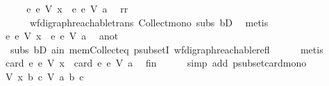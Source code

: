 \begin{isabellebody}
\ \ \isamarkupfalse%
\ \isamarkupfalse%
\ {\isachardoublequoteopen}{\isacharbraceleft}{\kern0pt}e{\isachardot}{\kern0pt}\ e\ {\isasymrightarrow}\isactrlsup {\isacharasterisk}{\kern0pt}\isactrlbsub V\isactrlesub \ x{\isacharbraceright}{\kern0pt}\ {\isasymsubseteq}\ {\isacharbraceleft}{\kern0pt}e{\isachardot}{\kern0pt}\ e\ {\isasymrightarrow}\isactrlsup {\isacharasterisk}{\kern0pt}\isactrlbsub V\isactrlesub \ a{\isacharbraceright}{\kern0pt}{\isachardoublequoteclose}\ \isamarkupfalse%
\ rr\isanewline
\ \ \ \ \ \ wf{\isacharunderscore}{\kern0pt}digraph{\isachardot}{\kern0pt}reachable{\isacharunderscore}{\kern0pt}trans\ Collect{\isacharunderscore}{\kern0pt}mono\ subs\ bD{}\ \isamarkupfalse%
\ metis\isanewline
\ \ \isamarkupfalse%
\ \isamarkupfalse%
\ {\isachardoublequoteopen}{\isacharbraceleft}{\kern0pt}e{\isachardot}{\kern0pt}\ e\ {\isasymrightarrow}\isactrlsup {\isacharasterisk}{\kern0pt}\isactrlbsub V\isactrlesub \ x{\isacharbraceright}{\kern0pt}\ {\isasymsubset}\ {\isacharbraceleft}{\kern0pt}e{\isachardot}{\kern0pt}\ e\ {\isasymrightarrow}\isactrlsup {\isacharasterisk}{\kern0pt}\isactrlbsub V\isactrlesub \ a{\isacharbraceright}{\kern0pt}{\isachardoublequoteclose}\ \isamarkupfalse%
\ a{\isacharunderscore}{\kern0pt}not\isanewline
\ \ subs\ bD{}\ a{\isacharunderscore}{\kern0pt}in\ mem{\isacharunderscore}{\kern0pt}Collect{\isacharunderscore}{\kern0pt}eq\ psubsetI\ wf{\isacharunderscore}{\kern0pt}digraph{\isachardot}{\kern0pt}reachable{\isacharunderscore}{\kern0pt}refl\isanewline
\ \ \ \ \isamarkupfalse%
\ metis\ \isanewline
\ \ \isamarkupfalse%
\ \isamarkupfalse%
\ {\isachardoublequoteopen}card\ {\isacharbraceleft}{\kern0pt}e{\isachardot}{\kern0pt}\ e\ {\isasymrightarrow}\isactrlsup {\isacharasterisk}{\kern0pt}\isactrlbsub V\isactrlesub \ x{\isacharbraceright}{\kern0pt}\ {\isacharless}{\kern0pt}\ card\ {\isacharbraceleft}{\kern0pt}e{\isachardot}{\kern0pt}\ e\ {\isasymrightarrow}\isactrlsup {\isacharasterisk}{\kern0pt}\isactrlbsub V\isactrlesub \ a{\isacharbraceright}{\kern0pt}{\isachardoublequoteclose}\ \isamarkupfalse%
\ fin\isanewline
\ \ \ \ \isamarkupfalse%
\ {\isacharparenleft}{\kern0pt}simp\ add{\isacharcolon}{\kern0pt}\ psubset{\isacharunderscore}{\kern0pt}card{\isacharunderscore}{\kern0pt}mono{\isacharparenright}{\kern0pt}\isanewline
\ \ \isamarkupfalse%
\ \isamarkupfalse%
\ {\isachardoublequoteopen}{\isacharparenleft}{\kern0pt}{\isacharparenleft}{\kern0pt}V{\isacharcomma}{\kern0pt}\ x{\isacharcomma}{\kern0pt}\ b{\isacharcomma}{\kern0pt}\ c{\isacharparenright}{\kern0pt}{\isacharcomma}{\kern0pt}\ V{\isacharcomma}{\kern0pt}\ a{\isacharcomma}{\kern0pt}\ b{\isacharcomma}{\kern0pt}\ c{\isacharparenright}{\kern0pt}\isanewline

\end{isabellebody}
